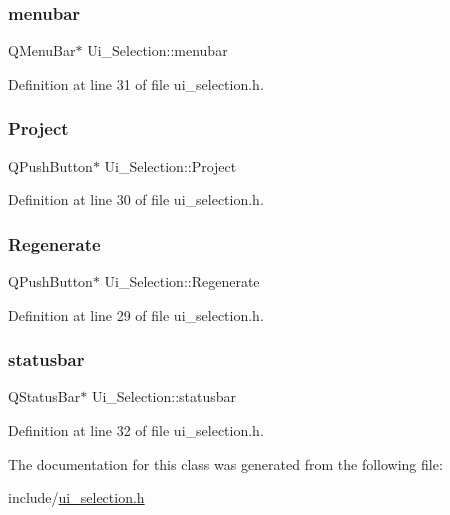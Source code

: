 \mbox{\label{class_ui___selection_a8a7614052678abd3ec8f1cbfeafb280e}} 
\subsubsection{\texorpdfstring{menubar}{menubar}}
{\footnotesize\ttfamily Q\+Menu\+Bar$\ast$ Ui\+\_\+\+Selection\+::menubar}



Definition at line 31 of file ui\+\_\+selection.\+h.

\mbox{\label{class_ui___selection_aff8310855fc34c39a35996e00c0d1121}} 
\subsubsection{\texorpdfstring{Project}{Project}}
{\footnotesize\ttfamily Q\+Push\+Button$\ast$ Ui\+\_\+\+Selection\+::\+Project}



Definition at line 30 of file ui\+\_\+selection.\+h.

\mbox{\label{class_ui___selection_ac47a6990711035b3b7788619d312b0e3}} 
\subsubsection{\texorpdfstring{Regenerate}{Regenerate}}
{\footnotesize\ttfamily Q\+Push\+Button$\ast$ Ui\+\_\+\+Selection\+::\+Regenerate}



Definition at line 29 of file ui\+\_\+selection.\+h.

\mbox{\label{class_ui___selection_a56ba552e01bc7a24e86f5e2fdf0fecbd}} 
\subsubsection{\texorpdfstring{statusbar}{statusbar}}
{\footnotesize\ttfamily Q\+Status\+Bar$\ast$ Ui\+\_\+\+Selection\+::statusbar}



Definition at line 32 of file ui\+\_\+selection.\+h.



The documentation for this class was generated from the following file\+:\begin{DoxyCompactItemize}
\item 
include/\mbox{\hyperlink{ui__selection_8h}{ui\+\_\+selection.\+h}}\end{DoxyCompactItemize}
